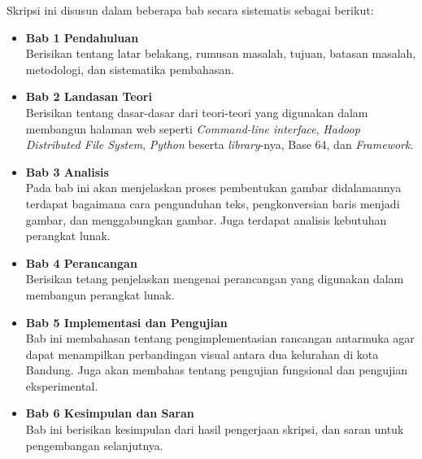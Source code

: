 Skripsi ini disusun dalam beberapa bab secara sistematis sebagai berikut:
\begin{itemize}
	\item \textbf{Bab 1 Pendahuluan} \\ 
	Berisikan tentang latar belakang, rumusan masalah, tujuan, batasan masalah, metodologi, dan sistematika pembahasan.
	\item \textbf{Bab 2 Landasan Teori} \\ 
	Berisikan tentang dasar-dasar dari teori-teori yang digunakan dalam membangun halaman web seperti \textit{Command-line interface}, \textit{Hadoop Distributed File System}, \textit{Python} beserta \textit{library}-nya, Base 64, dan \textit{Framework}.
	\item \textbf{Bab 3 Analisis} \\ 
	Pada bab ini akan menjelaskan proses pembentukan gambar didalamannya terdapat bagaimana cara pengunduhan teks, pengkonversian baris menjadi gambar, dan menggabungkan gambar. Juga terdapat analisis kebutuhan perangkat lunak.
	\item \textbf{Bab 4 Perancangan} \\
	Berisikan tetang penjelaskan mengenai perancangan yang digunakan dalam membangun perangkat lunak.
	\item \textbf{Bab 5 Implementasi dan Pengujian} \\
	Bab ini membahasan tentang pengimplementasian rancangan antarmuka agar dapat menampilkan perbandingan visual antara dua kelurahan di kota Bandung. Juga akan membahas tentang pengujian fungsional dan pengujian eksperimental.
	\item \textbf{Bab 6 Kesimpulan dan Saran} \\
	Bab ini berisikan kesimpulan dari hasil pengerjaan skripsi, dan saran untuk pengembangan selanjutnya.
	
	
\end{itemize}
